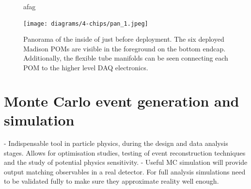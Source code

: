 \begin{figure} %
    \centering
    \quad
    \caption[afaga]
    {afag}
    \label{fig:work}
\end{figure}

\begin{figure} %
    \texttt{[image: diagrams/4-chips/pan\_1.jpeg]}
    \caption[Panorama of the inside of \chipsfive just before deployment.]
    {Panorama of the inside of \chipsfive just before deployment. The six deployed Madison POMs
        are visible in the foreground on the bottom endcap. Additionally, the flexible tube manifolds
        can be seen connecting each POM to the higher level DAQ electronics.}
    \label{fig:pan_1}
\end{figure}

\section{Monte Carlo event generation and simulation} %
\label{sec:chips_monte_carlo} %

- Indispensable tool in particle physics, during the design and data analysis stages. Allows for
optimisation studies, testing of event reconstruction techniques and the study of potential
physics sensitivity.
- Useful MC simulation will provide output matching observables in a real detector. For full
analysis simulations need to be validated fully to make sure they approximate reality well enough.

